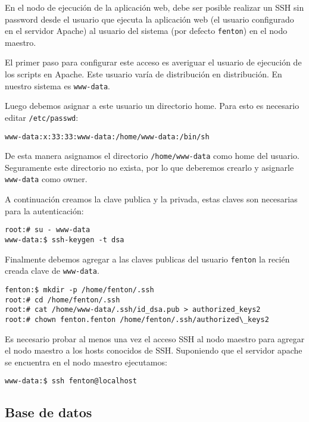 \documentclass[a4paper,10pt,spanish]{article}
\begin{document}
En el nodo de ejecuci\'{o}n de la aplicaci\'{o}n web, debe ser posible realizar un SSH sin password desde el usuario que ejecuta la aplicaci\'{o}n web (el usuario configurado en el servidor Apache) al usuario del sistema (por defecto \mbox{\texttt{fenton}}) en el nodo maestro. 

El primer paso para configurar este acceso es averiguar el usuario de ejecuci\'{o}n de los scripts en Apache. Este usuario var\'{i}a de distribuci\'{o}n en distribuci\'{o}n. En nuestro sistema es \mbox{\texttt{www-data}}.

Luego debemos asignar a este usuario un directorio home. Para esto es necesario editar \mbox{\texttt{/etc/passwd}}:

\begin{verbatim}
www-data:x:33:33:www-data:/home/www-data:/bin/sh
\end{verbatim}

De esta manera asignamos el directorio \mbox{\texttt{/home/www-data}} como home del usuario. Seguramente este directorio no exista, por lo que deberemos crearlo y asignarle \mbox{\texttt{www-data}} como owner.

A continuaci\'{o}n creamos la clave publica y la privada, estas claves son necesarias para la autenticaci\'{o}n:

\begin{verbatim}
root:# su - www-data
www-data:$ ssh-keygen -t dsa
\end{verbatim}

Finalmente debemos agregar a las claves publicas del usuario \mbox{\texttt{fenton}} la reci\'{e}n creada clave de \mbox{\texttt{www-data}}.

\begin{verbatim}
fenton:$ mkdir -p /home/fenton/.ssh
root:# cd /home/fenton/.ssh
root:# cat /home/www-data/.ssh/id_dsa.pub > authorized_keys2
root:# chown fenton.fenton /home/fenton/.ssh/authorized\_keys2
\end{verbatim}

Es necesario probar al menos una vez el acceso SSH al nodo maestro para agregar el nodo maestro a los hosts conocidos de SSH. Suponiendo que el servidor apache se encuentra en el nodo maestro ejecutamos:

\begin{verbatim}
www-data:$ ssh fenton@localhost
\end{verbatim}

\subsection{Base de datos}
\end{document}
